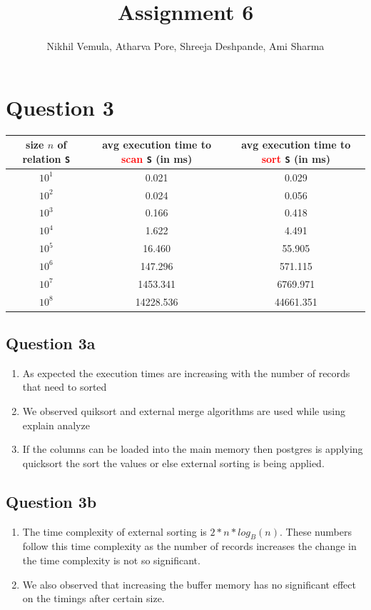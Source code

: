 \documentclass{article}
\title{Assignment 6}
\author{Nikhil Vemula, Atharva Pore, Shreeja Deshpande, Ami Sharma}
\begin{document}
  \maketitle
  \section*{Question 3}
  \begin{center}
    \begin{tabular}{c|c|c}
    size $n$ of relation {\tt S} & avg execution time to \textcolor{red}{scan} {\tt S} (in ms) &avg execution time to \textcolor{red}{sort} {\tt S} (in ms) \\ \hline
    $10^1$ &  0.021 & 0.029 \\
    $10^2$ & 0.024 &  0.056 \\
    $10^3$ & 0.166 & 0.418 \\
    $10^4$ & 1.622 & 4.491 \\
    $10^5$ & 16.460 & 55.905 \\
    $10^6$ & 147.296 & 571.115 \\
    $10^7$ & 1453.341 & 6769.971 \\
    $10^8$ & 14228.536 & 44661.351 \\
    \end{tabular}
    \end{center}
  \subsection*{Question 3a}
    \begin{enumerate}
      \item As expected the execution times are increasing with the number of records that need to sorted
      \item We observed quiksort and external merge algorithms are used while using explain analyze
      \item If the columns can be loaded into the main memory then postgres is applying quicksort the sort the values or else external sorting is being applied.
    \end{enumerate}
  \subsection*{Question 3b}
  \begin{enumerate}
    \item The time complexity of external sorting is $2 * n * log_B(n)$. These numbers follow this time complexity as the number of records increases the change in the time complexity is not so significant.
    \item We also observed that increasing the buffer memory has no significant effect on the timings after certain size.
  \end{enumerate}
\end{document}
